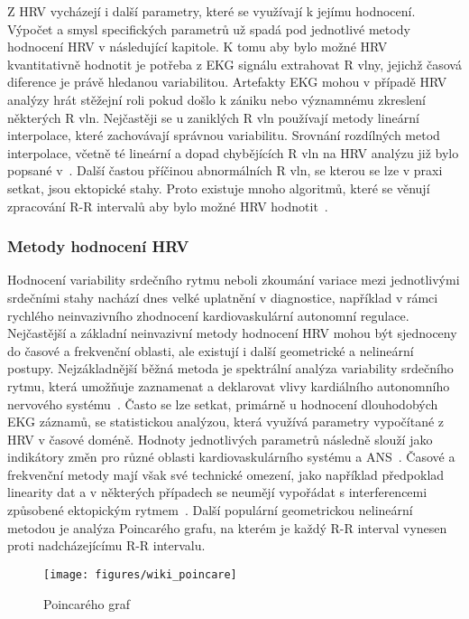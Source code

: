 Z HRV vycházejí i další parametry, které se využívají k jejímu hodnocení.
Výpočet a smysl specifických parametrů už spadá pod jednotlivé metody hodnocení
HRV v následující kapitole. K tomu aby bylo možné HRV kvantitativně hodnotit je
potřeba z EKG signálu extrahovat R vlny, jejichž časová diference je právě
hledanou variabilitou. Artefakty EKG mohou v případě HRV analýzy hrát stěžejní
roli pokud došlo k zániku nebo významnému zkreslení některých R vln. Nejčastěji
se u zaniklých R vln používají metody lineární interpolace, které zachovávají
správnou variabilitu. Srovnání rozdílných metod interpolace, včetně té lineární
a dopad chybějících R vln na HRV analýzu již bylo popsané
v~\cite{Kim2007,Peltola2012,Morelli2019}. Další častou příčinou abnormálních R
vln, se kterou se lze v praxi setkat, jsou ektopické stahy. Proto existuje mnoho
algoritmů, které se věnují zpracování R-R intervalů aby bylo možné HRV
hodnotit~\cite{Lipponen2019}.

\subsubsection{Metody hodnocení HRV}
\label{section:hrv_methods}
Hodnocení variability srdečního rytmu neboli zkoumání variace mezi jednotlivými
srdečními stahy nachází dnes velké uplatnění v diagnostice, například v rámci
rychlého neinvazivního zhodnocení kardiovaskulární autonomní regulace.
Nejčastější a základní neinvazivní metody hodnocení HRV mohou být sjednoceny do
časové a frekvenční oblasti, ale existují i další geometrické a nelineární
postupy. Nejzákladnější běžná metoda je spektrální analýza variability srdečního
rytmu, která umožňuje zaznamenat a deklarovat vlivy kardiálního autonomního
nervového systému~\cite{Pumprla2014}. Často se lze setkat, primárně u hodnocení
dlouhodobých EKG záznamů, se statistickou analýzou, která využívá parametry
vypočítané z HRV v časové doméně. Hodnoty jednotlivých parametrů následně slouží
jako indikátory změn pro různé oblasti kardiovaskulárního systému a
ANS~\cite{Malik1996}. Časové a frekvenční metody mají však své technické omezení, 
jako například předpoklad linearity dat a v některých případech se neumějí
vypořádat s interferencemi způsobené ektopickým rytmem~\cite{Hsu2012}. Další
populární geometrickou nelineární metodou je analýza Poincarého grafu, na kterém
je každý R-R interval vynesen proti nadcházejícímu R-R intervalu. 

\begin{figure}[h]
	\begin{center}
		\texttt{[image: figures/wiki\_poincare]}
		\caption{Poincarého graf~\cite{wikiPoincare}}
		\label{fig:wiki_poincare}
	\end{center}
\end{figure}

